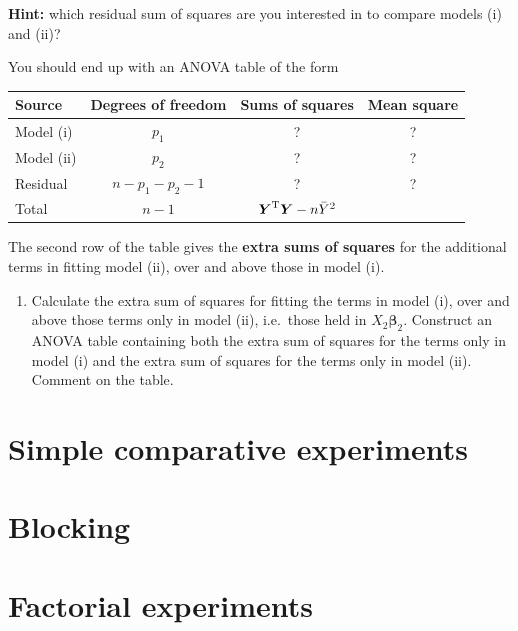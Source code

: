 \documentclass[
]{book}
\providecommand{\tightlist}{%
  \setlength{\itemsep}{0pt}\setlength{\parskip}{0pt}}
\theoremstyle{definition}
\theoremstyle{definition}
\theoremstyle{definition}
\theoremstyle{definition}
\theoremstyle{remark}
\begin{document}
\begin{enumerate}
  \textbf{Hint:} which residual sum of squares are you interested in to compare models (i) and (ii)?

  You should end up with an ANOVA table of the form

  \begin{longtable}[]{@{}lccc@{}}
  \toprule
  Source & Degrees of freedom & Sums of squares & Mean square \\
  \midrule
  \endhead
  Model (i) & \(p_1\) & ? & ? \\
  Model (ii) & \(p_2\) & ? & ? \\
  Residual & \(n-p_1-p_2-1\) & ? & ? \\
  Total & \(n-1\) & \(\boldsymbol{Y}^{\rm{T}}\boldsymbol{Y}- n\bar{Y}^2\) & \\
  \bottomrule
  \end{longtable}

  The second row of the table gives the \textbf{extra sums of squares} for the additional terms in fitting model (ii), over and above those in model (i).

  \begin{enumerate}
  \def\labelenumii{\alph{enumii}.}
  \setcounter{enumii}{2}
  \tightlist
  \item
    Calculate the extra sum of squares for fitting the terms in model (i), over and above those terms only in model (ii), i.e.~those held in \(X_2\boldsymbol{\beta}_2\). Construct an ANOVA table containing both the extra sum of squares for the terms only in model (i) and the extra sum of squares for the terms only in model (ii). Comment on the table.
  \end{enumerate}
\end{enumerate}

\hypertarget{simple-comparative-experiments}{%
\chapter{Simple comparative experiments}\label{simple-comparative-experiments}}

\hypertarget{blocking-1}{%
\chapter{Blocking}\label{blocking-1}}

\hypertarget{factorial-experiments}{%
\chapter{Factorial experiments}\label{factorial-experiments}}
\end{document}

